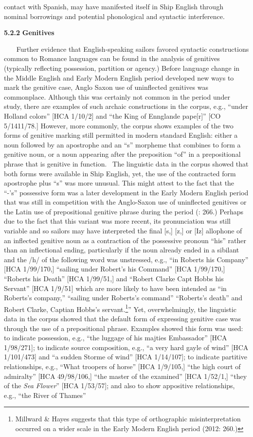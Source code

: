 contact with Spanish, may have manifested itself in Ship English through nominal borrowings and potential phonological and syntactic interference. ~

\textbf{5.2.2} \textbf{Genitives}

~~~   Further evidence that English-speaking sailors favored syntactic constructions common to Romance languages can be found in the analysis of genitives (typically reflecting possession, partition or agency.) Before language change in the Middle English and Early Modern English period developed new ways to mark the genitive case, Anglo Saxon use of uninflected genitives was commonplace. Although this was certainly not common in the period under study, there are examples of such archaic constructions in the corpus, e.g., “under Holland colors” [HCA 1/10/2] and “the King of Ennglande pape[r]” [CO 5/1411/78.] However, more commonly, the corpus shows examples of the two forms of genitive marking still permitted in modern standard English: either a noun followed by an apostrophe and an “s” morpheme that combines to form a genitive noun, or a noun appearing after the preposition “of” in a prepositional phrase that is genitive in function. ~The linguistic data in the corpus showed that both forms were available in Ship English, yet, the use of the contracted form apostrophe plus “s” was more unusual. This might attest to the fact that the “-’s” possessive form was a later development in the Early Modern English period that was still in competition with the Anglo-Saxon use of uninflected genitives or the Latin use of prepositional genitive phrase during the period (\citealt{Milward1996}: 266.) Perhaps due to the fact that this variant was more recent, its pronunciation was still variable and so sailors may have interpreted the final [s,] [z,] or [Iz] allophone of an inflected genitive noun as a contraction of the possessive pronoun “his” rather than an inflectional ending, particularly if the noun already ended in a sibilant and the /h/ of the following word was unstressed, e.g., “in Roberts his Company” [HCA 1/99/170,] “sailing under Robert’s his Command” [HCA 1/99/170,] “Roberts his Death” [HCA 1/99/51,] and “Robert Clarke Capt Hobbs his Servant” [HCA 1/9/51] which are more likely to have been intended as “in Roberts’s company,” “sailing under Roberts’s command” “Roberts’s death” and Robert Clarke, Captian Hobbs’s servant.\footnote{Millward \& Hayes suggests that this type of orthographic misinterpretation occurred on a wider scale in the Early Modern English period (2012: 260.)}” Yet, overwhelmingly, the linguistic data in the corpus showed that the default form of expressing genitive case was through the use of a prepositional phrase. Examples showed this form was used: to indicate possession, e.g., “the luggage of his majties Embassador” [HCA 1/98/271]; to indicate source composition, e.g., “a very hard gayle of wind” [HCA 1/101/473] and “a sudden Storme of wind” [HCA 1/14/107]; to indicate partitive relationships, e.g., “What troopers of horse” [HCA 1/9/105,] “the high court of admiralty” [HCA 49/98/106,] “the master of the examined” [HCA 1/52/1,] “they of the \textit{Sea Flower}” [HCA 1/53/57]; and also to show appositive relationships, e.g., “the River of Thames” 